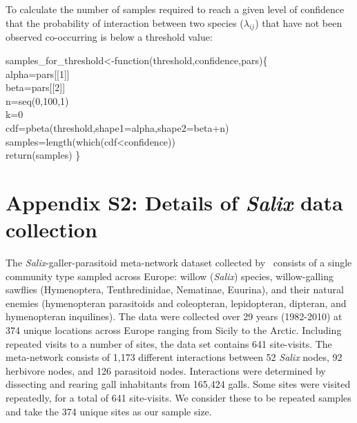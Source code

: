 \documentclass[12pt]{article}
\begin{document}
  To calculate the number of samples required to reach a given level of confidence that the probability of interaction between two species ($\lambda_{ij}$) that have not been observed co-occurring is below a threshold value:


  \vspace{12pt}
  \begin{em}
  \noindent \hspace{2pt}samples\_for\_threshold\textless-function(threshold,confidence,pars)\{\\
    \vspace{4pt}
    alpha=pars[[1]]\\
    beta=pars[[2]]\\
    n=seq(0,100,1)\\
    k=0\\ 
    cdf=pbeta(threshold,shape1=alpha,shape2=beta+n)\\
    samples=length(which(cdf\textless confidence))\\
    return(samples) \}
  \end{em}


\clearpage

\section*{Appendix S2: Details of \emph{Salix} data collection}

      The \emph{Salix}-galler-parasitoid meta-network dataset collected 
      by~\citet{Kopelke2017} consists of a single community type sampled across 
      Europe: willow (\emph{Salix}) species, willow-galling sawflies (Hymenoptera, Tenthredinidae, Nematinae, Euurina), and their natural 
      enemies (hymenopteran parasitoids and coleopteran, lepidopteran, dipteran, 
      and hymenopteran inquilines). The data were collected over 29 years 
      (1982-2010) at 374 unique locations across Europe ranging from Sicily to 
      the Arctic. Including repeated visits to a number of sites, the data set 
      contains 641 site-visits. The meta-network consists of 1,173 different interactions 
      between 52 \emph{Salix} nodes, 92 herbivore nodes, and 126 parasitoid 
      nodes. Interactions were determined by dissecting and rearing gall 
      inhabitants from 165,424 galls. Some sites were visited repeatedly, for a 
      total of 641 site-visits. We consider these to be repeated samples and 
      take the 374 unique sites as our sample size.


\clearpage
\end{document}
